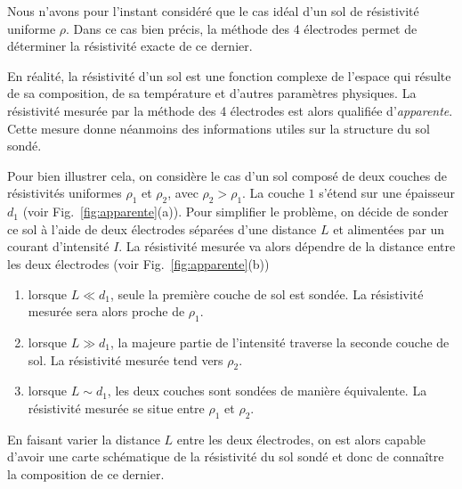 Nous n'avons pour l'instant considéré que le cas idéal d'un sol de résistivité 
uniforme $\rho$. Dans ce cas bien précis, la méthode des 4 électrodes permet de
déterminer la résistivité exacte de ce dernier. 

En réalité, la résistivité d'un sol est une fonction complexe de l'espace qui résulte 
de sa composition, de sa température et d'autres paramètres physiques. 
La résistivité mesurée par la méthode des 4 électrodes est alors
qualifiée d'\emph{apparente}. Cette mesure donne néanmoins des informations utiles
sur la structure du sol sondé.

Pour bien illustrer cela, on considère le cas d'un sol composé de deux couches
de résistivités uniformes $\rho_1$ et $\rho_2$, avec $\rho_2 > \rho_1$. La couche $1$ 
s'étend sur une épaisseur $d_1$ (voir Fig.~\ref{fig:apparente}(a)). 
Pour simplifier le problème,
on décide de sonder ce sol à l'aide de deux électrodes séparées d'une distance $L$
et alimentées par un courant d'intensité $I$. La résistivité mesurée va alors dépendre de
la distance entre les deux électrodes (voir Fig.~\ref{fig:apparente}(b))
\begin{enumerate}
	\item lorsque $L \ll d_1$, seule la première couche de sol est sondée.
	  La résistivité mesurée sera alors proche de $\rho_1$.
	\item lorsque $L \gg d_1$, la majeure partie de l'intensité traverse la seconde
	  couche de sol. La résistivité mesurée tend vers $\rho_2$.
	\item lorsque $L \sim d_1$, les deux couches sont sondées de manière équivalente.
	  La résistivité mesurée se situe entre $\rho_1$ et $\rho_2$.
\end{enumerate}
En faisant varier la distance $L$ entre les deux électrodes, on est alors capable d'avoir
une carte schématique de la résistivité du sol sondé et donc de connaître la 
composition de ce dernier. 



